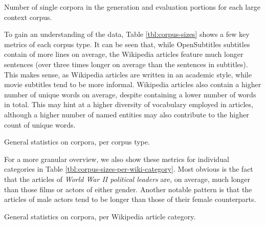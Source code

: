 \begin{table}[ht]
	\centering
	
	\caption{Number of single corpora in the generation and evaluation portions for each large context corpus.}
	\label{tbl:train-test-corpora}
\end{table}


To gain an understanding of the data, Table \ref{tbl:corpus-sizes} shows a few key metrics of each corpus type.
It can be seen that, while OpenSubtitles subtitles contain of more lines on average, the Wikipedia articles feature much longer sentences (over three times longer on average than the sentences in subtitles).
This makes sense, as Wikipedia articles are written in an academic style, while movie subtitles tend to be more informal.
Wikipedia articles also contain a higher number of unique words on average, despite containing a lower number of words in total.
This may hint at a higher diversity of vocabulary employed in articles, although a higher number of named entities may also contribute to the higher count of unique words.

\begin{table}[ht]
	\centering
	\resizebox{\textwidth}{!}{%
		
	}
	\caption{General statistics on corpora, per corpus type.}
	\label{tbl:corpus-sizes}
\end{table}


For a more granular overview, we also show these metrics for individual categories in Table \ref{tbl:corpus-sizes-per-wiki-category}.
Most obvious is the fact that the articles of \textit{World War II political leaders} are, on average, much longer than those films or actors of either gender.
Another notable pattern is that the articles of male actors tend to be longer than those of their female counterparts.


\begin{table}[ht]
	\centering
	\resizebox{\textwidth}{!}{%
		
	}
	\caption{General statistics on corpora, per Wikipedia article category.}
	\label{tbl:corpus-sizes-per-wiki-category}
\end{table}

